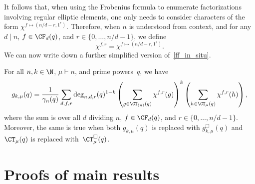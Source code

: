 It follows that, when using the Frobenius formula to enumerate factorizations involving regular elliptic elements, one only needs to consider characters of the form \(\chi^{f \mapsto (n/d-r,1^r)}\).
Therefore, when \(n\) is understood from context, and for any \(d \mid n\), \(f \in \CF_d (q)\), and \(r \in \{0,\ldots,n/d-1\}\), we define
\begin{equation}
\chi^{f,r} = \chi^{f \mapsto (n/d-r,1^r)}.
\end{equation}
We can now write down a further simplified version of~\eqref{ff_in_situ}.
\begin{corollary}
\label{simpler_ff_in_situ_corollary}
For all \(n,k \in \N\), \(\mu \vdash n\), and prime powers~\(q\), we have
\begin{equation}
\label{simpler_ff_in_situ}
g_{k,\mu} (q)
=
\frac{1}{\gamma_n(q)}
\sum_{d,f,r}
\deg_{n,d,r}(q)^{1-k}
\left ( \sum_{g \in \CT_{(n)} (q)} \chi^{f,r}(g) \right )^k
\left ( \sum_{h \in \CT_\mu (q)}   \chi^{f,r}(h) \right ),
\end{equation}
where the sum is over all \(d\) dividing \(n\), \(f \in \CF_d (q)\), and \(r \in \{0,\ldots,n/d-1\}\).
Moreover, the same is true when both \(g_{k,\mu} (q)\) is replaced with \(g_{k,\mu}^\Box (q)\) and \(\CT_\mu (q)\) is replaced with~\(\CT_\mu^\Box (q)\).
\end{corollary}















































\section{Proofs of main results}
\label{main_results_section}


































